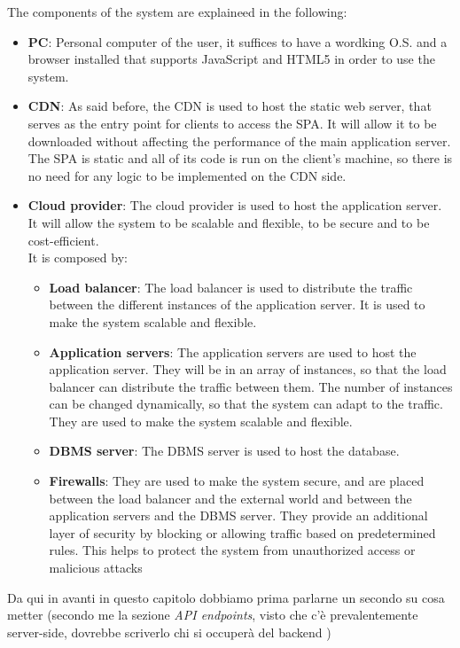 The components of the system are explaineed in the following:
\begin{itemize}
    \item \textbf{PC}: Personal computer of the user, it suffices to have a wordking O.S. and a browser installed that supports JavaScript and HTML5 in order to use the system.
    \item \textbf{CDN}: As said before, the CDN is used to host the static web server, that serves as the entry point for clients to access the SPA. It will allow it to be downloaded without affecting the performance of the main application server. The SPA is static and all of its code is run on the client's machine, so there is no need for any logic to be implemented on the CDN side.
    \item \textbf{Cloud provider}: The cloud provider is used to host the application server. It will allow the system to be scalable and flexible, to be secure and to be cost-efficient.\\
          It is composed by:
          \begin{itemize}
              \item \textbf{Load balancer}: The load balancer is used to distribute the traffic between the different instances of the application server. It is used to make the system scalable and flexible.
              \item \textbf{Application servers}: The application servers are used to host the application server. They will be in an array of instances, so that the load balancer can distribute the traffic between them. The number of instances can be changed dynamically, so that the system can adapt to the traffic. They are used to make the system scalable and flexible.
              \item \textbf{DBMS server}: The DBMS server is used to host the database.
              \item \textbf{Firewalls}: They are used to make the system secure, and are placed between the load balancer and the external world and between the application servers and the DBMS server. They provide an additional layer of security by blocking or allowing traffic based on predetermined rules. This helps to protect the system from unauthorized access or malicious attacks
          \end{itemize}
\end{itemize}


{\color{red} Da qui in avanti in questo capitolo dobbiamo prima parlarne un secondo su cosa metter (secondo me la sezione \textit{API endpoints}, visto che c'è prevalentemente server-side, dovrebbe scriverlo chi si occuperà del backend )}
